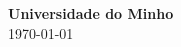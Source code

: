 \documentclass[12pt]{article}
\begin{document}
\begin{titlepage}
{ \large \bfseries 
Universidade do Minho}\\[0.5cm] 

{\large \today}\\[3cm] %
\vfill %

\end{titlepage}



\renewcommand{\listfigurename}{Contents}
\tableofcontents
\newpage



\newpage
{}
%
%
\end{document}
